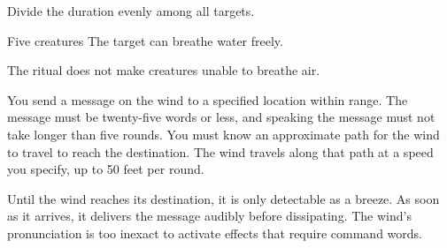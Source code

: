 \spellspecial Divide the duration evenly among all targets.
\begin{spelltargets}{Five creatures}
    \spelleffect The target can breathe water freely. 
\end{spelltargets}
\spellnotes The ritual does not make creatures unable to breathe air.

\spelleffect You send a message on the wind to a specified location within range. The message must be twenty-five words or less, and speaking the message must not take longer than five rounds. You must know an approximate path for the wind to travel to reach the destination. The wind travels along that path at a speed you specify, up to 50 feet per round.

Until the wind reaches its destination, it is only detectable as a breeze. As soon as it arrives, it delivers the message audibly before dissipating.
\spellnotes The wind's pronunciation is too inexact to activate effects that require command words.

